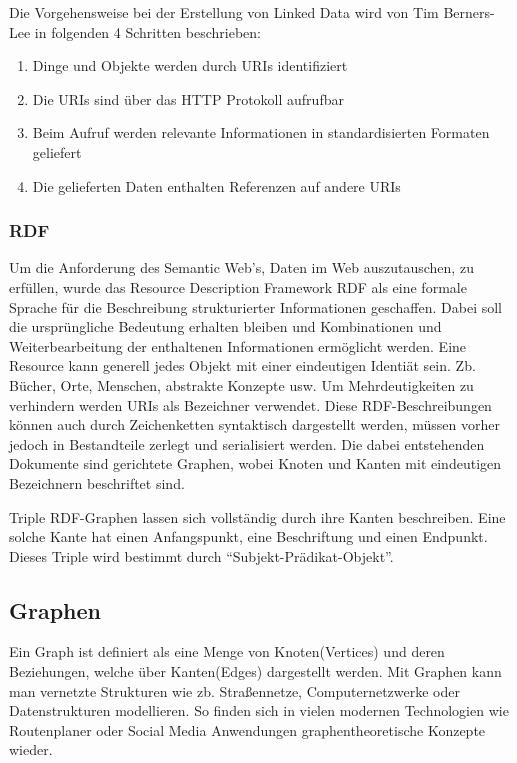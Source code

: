 Die Vorgehensweise bei der Erstellung von Linked Data wird von Tim Berners-Lee in folgenden 4 Schritten beschrieben:

\begin{enumerate}
	\item Dinge und Objekte werden durch URIs identifiziert
	\item Die URIs sind über das HTTP Protokoll aufrufbar
	\item Beim Aufruf werden relevante Informationen in standardisierten Formaten geliefert
	\item Die gelieferten Daten enthalten Referenzen auf andere URIs
\end{enumerate}
\subsubsection{RDF}

Um die Anforderung des Semantic Web’s, Daten im Web auszutauschen, zu erfüllen, wurde das Resource Description Framework RDF als eine formale Sprache für die Beschreibung strukturierter Informationen geschaffen. Dabei soll die ursprüngliche Bedeutung erhalten bleiben und Kombinationen und Weiterbearbeitung der enthaltenen Informationen ermöglicht werden.
Eine Resource kann generell jedes Objekt mit einer eindeutigen Identiät sein. Zb. Bücher, Orte, Menschen, abstrakte Konzepte usw. Um Mehrdeutigkeiten zu verhindern werden URIs als Bezeichner verwendet. Diese RDF-Beschreibungen können auch durch Zeichenketten syntaktisch dargestellt werden, müssen vorher jedoch in Bestandteile zerlegt und serialisiert werden. Die dabei entstehenden Dokumente sind gerichtete Graphen, wobei Knoten und Kanten mit eindeutigen Bezeichnern beschriftet sind. 
 
Triple
RDF-Graphen lassen sich vollständig durch ihre Kanten beschreiben. Eine solche Kante hat einen Anfangspunkt, eine Beschriftung und einen Endpunkt. Dieses Triple wird bestimmt durch “Subjekt-Prädikat-Objekt”.


\subsection{Graphen}

Ein Graph ist definiert als eine Menge von Knoten(Vertices) und deren Beziehungen, welche über Kanten(Edges) dargestellt werden. Mit Graphen kann man vernetzte Strukturen wie zb. Straßennetze, Computernetzwerke oder Datenstrukturen modellieren. So finden sich in vielen modernen Technologien wie Routenplaner oder Social Media Anwendungen graphentheoretische Konzepte wieder.
